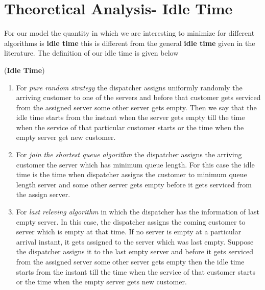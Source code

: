 \documentclass[a4paper,english,12pt]{article}
\begin{document}
\section{Theoretical Analysis- Idle Time}
For our model the quantity in which we are interesting to minimize for different algorithms is \textbf{idle time} this is different from the general \textbf{idle time} given in the literature. The definition of our idle time is given below  
\begin{defn}(\textbf{Idle Time})
\begin{enumerate}
\item For \textit{pure random strategy} the dispatcher assigns uniformly randomly the arriving customer to one of the servers and before that customer gets serviced from the assigned server some other server gets empty. Then we say that the idle time starts from the instant when the server gets empty till the time when the service of that particular customer starts or the time when the empty server get new customer.
\item For \textit{join the shortest queue algorithm} the dispatcher assigns the arriving  customer the server which has minimum queue length. For this case the idle time is the time when dispatcher assigns the customer to minimum queue length server and some other server gets empty before it gets serviced from the assign server. 
\item For \textit{last releving algorithm} in which the dispatcher has the information of last empty server. In this case, the dispatcher assigns the coming customer to server which is empty at that time. If no server is empty at a particular arrival instant,  it gets assigned to the server which was last empty. Suppose the dispatcher assigns it to the last empty server and before it gets serviced from the assigned server some other server gets empty then the idle time starts from the instant till the time when the service of that customer starts or the time when the empty server gets new customer.
\end{enumerate}
\end{defn}
\end{document}

